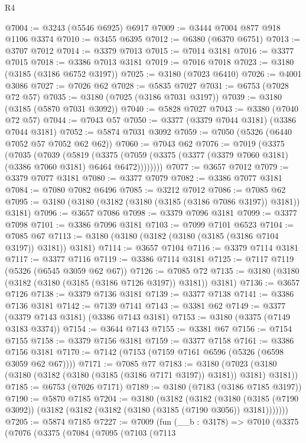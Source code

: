 \begin{lexlean}{R4}
\begin{coremodule}
@7004 := @3243 (@5546 @6925) @6917
@7009 := @3444 @7004 @877 @918 @1106 @3374
@7010 := @3455 @6395
@7012 := @6380 (@6370 @6751)
@7013 := @3707 @7012
@7014 := @3379 @7013
@7015 := @7014 @3181
@7016 := @3377 @7015
@7018 := @3386 @7013 @3181
@7019 := @7016 @7018
@7023 := @3180 (@3185 (@3186 @6752 @3197))
@7025 := @3180 (@7023 @6410)
@7026 := @4001 @3086
@7027 := @7026 @62
@7028 := @5835 @7027
@7031 := @6753 (@7028 @72 @57)
@7035 := @3180 (@7025 (@3186 @7031 @3197))
@7039 := @3180 (@3185 (@5870 @7031 @3092))
@7040 := @5828 @7027
@7043 := @3380 (@7040 @72 @57)
@7044 := @7043 @57
@7050 := @3377 (@3379 @7044 @3181) (@3386 @7044 @3181)
@7052 := @5874 @7031 @3092
@7059 := @7050 (@5326 (@6440 @7052 @57 @7052 @62 @62))
@7060 := @7043 @62
@7076 := @7019
    (@3375
      (@7035
        (@7039
          (@5819
            (@3375 (@7059 (@3375 (@3377 (@3379 @7060 @3181) (@3386 @7060 @3181) @6464 @6472))))))))
@7077 := @3657 @7012
@7079 := @3379 @7077 @3181
@7080 := @3377 @7079
@7082 := @3386 @7077 @3181
@7084 := @7080 @7082 @6496
@7085 := @3212 @7012
@7086 := @7085 @62
@7095 := @3180 (@3180 (@3182 (@3180 (@3185 (@3186 @7086 @3197)) @3181)) @3181)
@7096 := @3657 @7086
@7098 := @3379 @7096 @3181
@7099 := @3377 @7098
@7101 := @3386 @7096 @3181
@7103 := @7099 @7101 @6523
@7104 := @7085 @67
@7113 := @3180 (@3180 (@3182 (@3180 (@3185 (@3186 @7104 @3197)) @3181)) @3181)
@7114 := @3657 @7104
@7116 := @3379 @7114 @3181
@7117 := @3377 @7116
@7119 := @3386 @7114 @3181
@7125 := @7117 @7119 (@5326 (@6545 @3059 @62 @67))
@7126 := @7085 @72
@7135 := @3180 (@3180 (@3182 (@3180 (@3185 (@3186 @7126 @3197)) @3181)) @3181)
@7136 := @3657 @7126
@7138 := @3379 @7136 @3181
@7139 := @3377 @7138
@7141 := @3386 @7136 @3181
@7142 := @7139 @7141
@7143 := @3381 @62
@7149 := @3377 (@3379 @7143 @3181) (@3386 @7143 @3181)
@7153 := @3180 (@3375 (@7149 @3183 @3374))
@7154 := @3644 @7143
@7155 := @3381 @67
@7156 := @7154 @7155
@7158 := @3379 @7156 @3181
@7159 := @3377 @7158
@7161 := @3386 @7156 @3181
@7170 := @7142 (@7153 (@7159 @7161 @6596 (@5326 (@6598 @3059 @62 @67))))
@7171 := @7085 @77
@7183 := @3180 (@7023 (@3180 (@3180 (@3182 (@3180 (@3185 (@3186 @7171 @3197)) @3181)) @3181) @3181))
@7185 := @6753 (@7026 @7171)
@7189 := @3180 (@7183 (@3186 @7185 @3197))
@7190 := @5870 @7185
@7204 := @3180
    (@3182
      (@3182
        (@3180 (@3185 (@7190 @3092)) (@3182 (@3182 (@3182 (@3180 (@3185 (@7190 @3056)) @3181)))))))
@7205 := @5874 @7185
@7227 := @7009
    (fun (__b : @3178) =>
    @7010
      (@3375
        (@7076
          (@3375
            (@7084
              (@7095
                (@7103
                  (@7113

\end{coremodule}
\end{lexlean}
